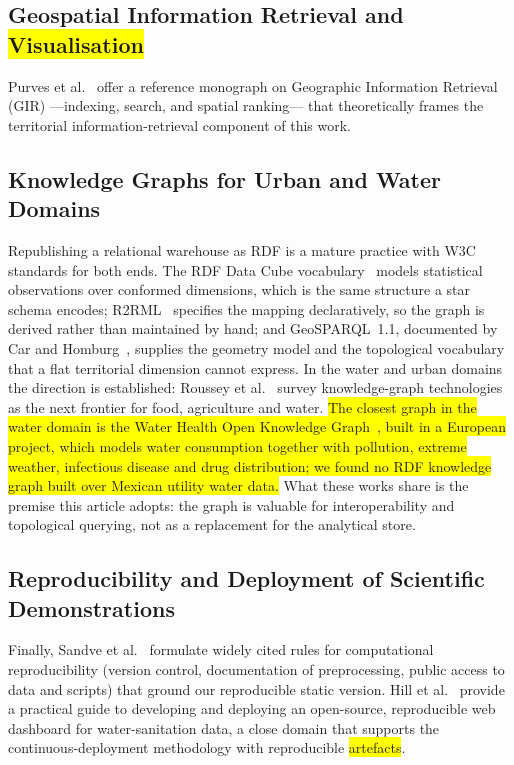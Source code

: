 \documentclass[runningheads]{llncs}
\newif\ifmarcarcambios
\newenvironment{icokgblock}{\ifmarcarcambios\color{nuevo}\fi}{}
\newcommand{\nuevo}[1]{\colorbox{yellow}{#1}}
\renewcommand{\_}{\origunderscore\allowbreak}
\begin{document}
\subsection{Geospatial Information Retrieval and \nuevo{Visualisation}}

Purves et al.~\cite{purves2018} offer a reference monograph on Geographic Information Retrieval (GIR) ---indexing, search, and spatial ranking--- that theoretically frames the territorial information-retrieval component of this work.

\begin{icokgblock}
\subsection{Knowledge Graphs for Urban and Water Domains}

Republishing a relational warehouse as RDF is a mature practice with W3C
standards for both ends. The RDF Data Cube vocabulary~\cite{datacube} models
statistical observations over conformed dimensions, which is the same structure a
star schema encodes; R2RML~\cite{r2rml} specifies the mapping declaratively, so
the graph is derived rather than maintained by hand; and GeoSPARQL~1.1, documented by Car and
Homburg~\cite{carhomburg2022}, supplies the geometry model and the topological
vocabulary that a flat territorial dimension cannot express. In the
water and urban domains the direction is established: Roussey et
al.~\cite{roussey2023} survey knowledge-graph technologies as the next frontier
for food, agriculture and water. \nuevo{The closest graph in the water domain is
the Water Health Open Knowledge Graph~\cite{lippolis2025}, built in a European
project, which models water consumption together with pollution, extreme weather,
infectious disease and drug distribution; we found no RDF knowledge graph built
over Mexican utility water data.} What these works share is the premise this
article adopts: the graph is valuable for interoperability and topological
querying, not as a replacement for the analytical store.
\end{icokgblock}

\subsection{Reproducibility and Deployment of Scientific Demonstrations}

Finally, Sandve et al.~\cite{sandve2013} formulate widely cited rules for computational reproducibility (version control, documentation of preprocessing, public access to data and scripts) that ground our reproducible static version. Hill et al.~\cite{hill2023} provide a practical guide to developing and deploying an open-source, reproducible web dashboard for water-sanitation data, a close domain that supports the continuous-deployment methodology with reproducible \nuevo{artefacts}.
\end{document}
